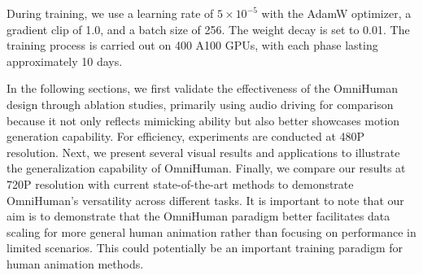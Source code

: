    During training, we use a learning rate of $5 \times 10^{-5}$ with the AdamW optimizer, a gradient clip of 1.0, and a batch size of 256. The weight decay is set to 0.01. The training process is carried out on 400 A100 GPUs, with each phase lasting approximately 10 days.
\par
In the following sections, we first validate the effectiveness of the OmniHuman design through ablation studies, primarily using audio driving for comparison because it not only reflects mimicking ability but also better showcases motion generation capability. For efficiency, experiments are conducted at 480P resolution. Next, we present several visual results and applications to illustrate the generalization capability of OmniHuman. Finally, we compare our results at 720P resolution with current state-of-the-art methods to demonstrate OmniHuman's versatility across different tasks. It is important to note that our aim is to demonstrate that the OmniHuman paradigm better facilitates data scaling for more general human animation rather than focusing on performance in limited scenarios. This could potentially be an important training paradigm for human animation methods.




